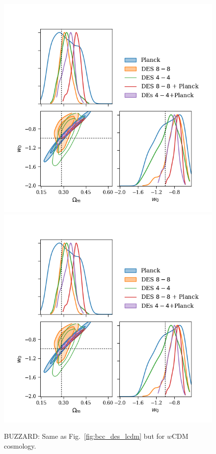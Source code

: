 \documentclass[fleqn,usenatbib]{mnras}
\begin{document}
\begin{figure}
\includegraphics[width=\columnwidth]{figs/buzzard_wcdm_lin_om-w.png}
\includegraphics[width=\columnwidth]{figs/buzzard_wcdm_lin_om-w.png}
\caption[]{BUZZARD: Same as Fig.~\ref{fig:bcc_des_lcdm} but for $w$CDM cosmology.}
\label{fig:bcc_des_wcdm}
\end{figure}
\end{document}
